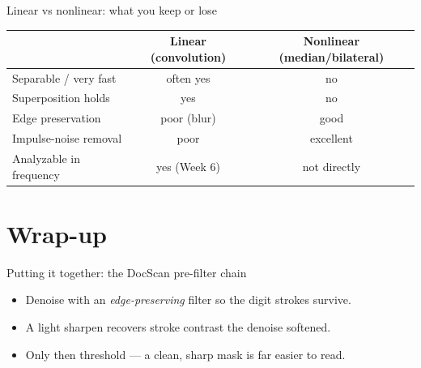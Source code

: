 \documentclass[10pt,aspectratio=169]{beamer}
\begin{document}
\begin{frame}{Linear vs nonlinear: what you keep or lose}
  \begin{center}
  \begin{tabular}{@{}lcc@{}}
    \toprule
    & \textbf{Linear (convolution)} & \textbf{Nonlinear (median/bilateral)} \\
    \midrule
    Separable / very fast & often yes & no \\
    Superposition holds & yes & no \\
    Edge preservation & poor (blur) & good \\
    Impulse-noise removal & poor & excellent \\
    Analyzable in frequency & yes (Week 6) & not directly \\
    \bottomrule
  \end{tabular}
  \end{center}
\end{frame}

\section{Wrap-up}

\begin{frame}{Putting it together: the DocScan pre-filter chain}
  \begin{center}
  \end{center}
  \begin{itemize}
    \item Denoise with an \emph{edge-preserving} filter so the digit strokes survive.
    \item A light sharpen recovers stroke contrast the denoise softened.
    \item Only then threshold — a clean, sharp mask is far easier to read.
  \end{itemize}
\end{frame}
\end{document}
